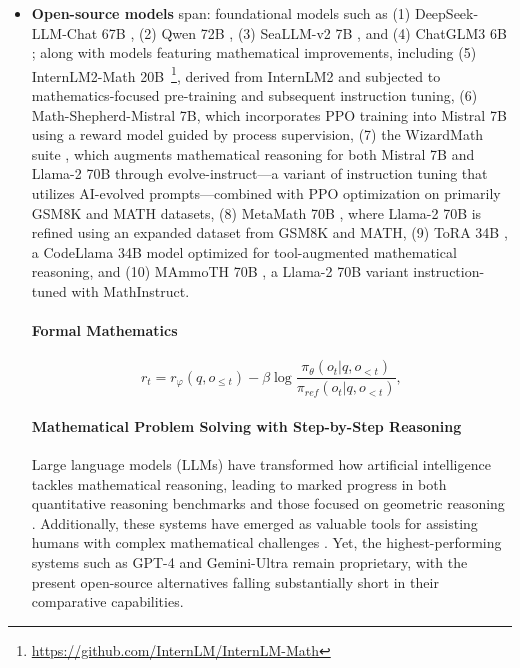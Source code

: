 \begin{itemize}[topsep=0pt]
These models are generally intended for a wide range of applications, with most having been subjected to various alignment strategies. 
    \item \textbf{Open-source models} span: foundational models such as (1) DeepSeek-LLM-Chat 67B \citep{deepseek-llm}, (2) Qwen 72B \citep{qwen}, (3) SeaLLM-v2 7B \citep{seallm}, and (4) ChatGLM3 6B \citep{chatglm3}; along with models featuring mathematical improvements, including (5) InternLM2-Math 20B~\footnote{\url{https://github.com/InternLM/InternLM-Math}}, derived from InternLM2 and subjected to mathematics-focused pre-training and subsequent instruction tuning, (6) Math-Shepherd-Mistral 7B, which incorporates PPO training \citep{schulman2017proximal} into Mistral 7B \citep{mistral} using a reward model guided by process supervision, (7) the WizardMath suite \citep{wizardmath}, which augments mathematical reasoning for both Mistral 7B and Llama-2 70B \citep{llama2} through evolve-instruct—a variant of instruction tuning that utilizes AI-evolved prompts—combined with PPO optimization on primarily GSM8K and MATH datasets, (8) MetaMath 70B \citep{metamath}, where Llama-2 70B is refined using an expanded dataset from GSM8K and MATH, (9) ToRA 34B \cite{tora}, a CodeLlama 34B model optimized for tool-augmented mathematical reasoning, and (10) MAmmoTH 70B \citep{MathInstruct}, a Llama-2 70B variant instruction-tuned with MathInstruct.

\paragraph{Formal Mathematics}

\begin{equation}
    r_{t} = r_\varphi(q, o_{\le t}) - \beta \log\frac{\pi_{\theta}(o_{t}|q, o_{<t})}{\pi_{ref}(o_{t}|q, o_{<t})},
\label{eq:PPO-reward}
\end{equation}

\paragraph{Mathematical Problem Solving with Step-by-Step Reasoning}

Large language models (LLMs) have transformed how artificial intelligence tackles mathematical reasoning, leading to marked progress in both quantitative reasoning benchmarks \citep{MATH} and those focused on geometric reasoning \citep{trinh2024solving}. Additionally, these systems have emerged as valuable tools for assisting humans with complex mathematical challenges \citep{tao}. Yet, the highest-performing systems such as GPT-4 \citep{gpt4} and Gemini-Ultra \citep{gemini} remain proprietary, with the present open-source alternatives falling substantially short in their comparative capabilities.


\end{itemize}
